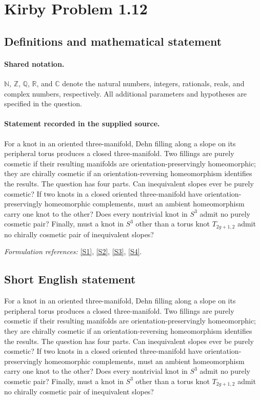 \documentclass[11pt]{article}
\newcommand{\sref}[2]{\hyperlink{source:#1:#2}{[S#2]}}
\begin{document}
\section{Kirby Problem 1.12}\label{statement}

\subsection{Definitions and mathematical statement}

\paragraph{Shared notation.}$\mathbb N$, $\mathbb Z$, $\mathbb Q$, $\mathbb R$, and $\mathbb C$ denote the natural numbers, integers, rationals, reals, and complex numbers, respectively. All additional parameters and hypotheses are specified in the question.


\paragraph{Statement recorded in the supplied source.}
For a knot in an oriented three-manifold, Dehn filling along a slope on its peripheral torus produces a closed three-manifold. Two fillings are purely cosmetic if their resulting manifolds are orientation-preservingly homeomorphic; they are chirally cosmetic if an orientation-reversing homeomorphism identifies the results. The question has four parts. Can inequivalent slopes ever be purely cosmetic? If two knots in a closed oriented three-manifold have orientation-preservingly homeomorphic complements, must an ambient homeomorphism carry one knot to the other? Does every nontrivial knot in $S^3$ admit no purely cosmetic pair? Finally, must a knot in $S^3$ other than a torus knot $T_{2g+1,2}$ admit no chirally cosmetic pair of inequivalent slopes?
\par\smallskip\textit{Formulation references:} \sref{statement}{1}, \sref{statement}{2}, \sref{statement}{3}, \sref{statement}{4}.
\subsection{Short English statement}
For a knot in an oriented three-manifold, Dehn filling along a slope on its peripheral torus produces a closed three-manifold. Two fillings are purely cosmetic if their resulting manifolds are orientation-preservingly homeomorphic; they are chirally cosmetic if an orientation-reversing homeomorphism identifies the results. The question has four parts. Can inequivalent slopes ever be purely cosmetic? If two knots in a closed oriented three-manifold have orientation-preservingly homeomorphic complements, must an ambient homeomorphism carry one knot to the other? Does every nontrivial knot in $S^3$ admit no purely cosmetic pair? Finally, must a knot in $S^3$ other than a torus knot $T_{2g+1,2}$ admit no chirally cosmetic pair of inequivalent slopes?
\end{document}
